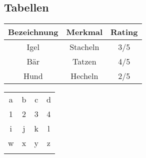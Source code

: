 \subsection{Tabellen}
\begin{minipage}{0.5\textwidth}
\begin{center}
	\begin{tabular}{|c c c|}
		\hline
		Bezeichnung & Merkmal & Rating \\ \hline
		Igel & Stacheln & 3/5 \\
		Bär & Tatzen & 4/5 \\
		Hund & Hecheln & 2/5 \\
		\hline
	\end{tabular}
\end{center}
\end{minipage}
\begin{minipage}{0.5\textwidth}
\begin{center}
	\begin{tabular}{||cc||c|c||}
		\hhline{|t:==:t:==:t|}
		a&b&c&d\\
		\hhline{|:==:|~|~||}
		1&2&3&4\\
		\hhline{#==#~|=#}
		i&j&k&l\\
		\hhline{||--||--||}
		w&x&y&z\\
		\hhline{|b:==:b:==:b|}
	\end{tabular}
\end{center}
\end{minipage}

